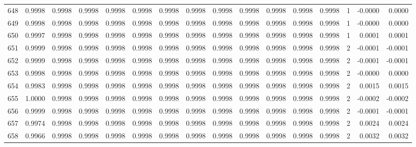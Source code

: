 \begin{tabular}{lrrrrrrrrrrrrrrr}
648 &      0.9998 &  0.9998 &  0.9998 &  0.9998 &  0.9998 &  0.9998 &  0.9998 &  0.9998 &  0.9998 &  0.9998 &   0.9998 &     0.9998 &      1 &                   -0.0000 &                     0.0000 \\
649 &      0.9998 &  0.9998 &  0.9998 &  0.9998 &  0.9998 &  0.9998 &  0.9998 &  0.9998 &  0.9998 &  0.9998 &   0.9998 &     0.9998 &      1 &                   -0.0000 &                     0.0000 \\
650 &      0.9997 &  0.9998 &  0.9998 &  0.9998 &  0.9998 &  0.9998 &  0.9998 &  0.9998 &  0.9998 &  0.9998 &   0.9998 &     0.9998 &      1 &                    0.0001 &                     0.0001 \\
651 &      0.9999 &  0.9998 &  0.9998 &  0.9998 &  0.9998 &  0.9998 &  0.9998 &  0.9998 &  0.9998 &  0.9998 &   0.9998 &     0.9998 &      2 &                   -0.0001 &                    -0.0001 \\
652 &      0.9999 &  0.9998 &  0.9998 &  0.9998 &  0.9998 &  0.9998 &  0.9998 &  0.9998 &  0.9998 &  0.9998 &   0.9998 &     0.9998 &      2 &                   -0.0001 &                    -0.0001 \\
653 &      0.9998 &  0.9998 &  0.9998 &  0.9998 &  0.9998 &  0.9998 &  0.9998 &  0.9998 &  0.9998 &  0.9998 &   0.9998 &     0.9998 &      2 &                   -0.0000 &                     0.0000 \\
654 &      0.9983 &  0.9998 &  0.9998 &  0.9998 &  0.9998 &  0.9998 &  0.9998 &  0.9998 &  0.9998 &  0.9998 &   0.9998 &     0.9998 &      2 &                    0.0015 &                     0.0015 \\
655 &      1.0000 &  0.9998 &  0.9998 &  0.9998 &  0.9998 &  0.9998 &  0.9998 &  0.9998 &  0.9998 &  0.9998 &   0.9998 &     0.9998 &      2 &                   -0.0002 &                    -0.0002 \\
656 &      0.9999 &  0.9998 &  0.9998 &  0.9998 &  0.9998 &  0.9998 &  0.9998 &  0.9998 &  0.9998 &  0.9998 &   0.9998 &     0.9998 &      2 &                   -0.0001 &                    -0.0001 \\
657 &      0.9974 &  0.9998 &  0.9998 &  0.9998 &  0.9998 &  0.9998 &  0.9998 &  0.9998 &  0.9998 &  0.9998 &   0.9998 &     0.9998 &      2 &                    0.0024 &                     0.0024 \\
658 &      0.9966 &  0.9998 &  0.9998 &  0.9998 &  0.9998 &  0.9998 &  0.9998 &  0.9998 &  0.9998 &  0.9998 &   0.9998 &     0.9998 &      2 &                    0.0032 &                     0.0032 \\

\end{tabular}
